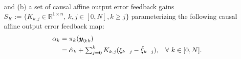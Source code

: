 \documentclass[letterpaper, 10 pt, conference]{ieeeconf}
\newcommand{\R}{\mathbb{R}}
\newcommand{\?}{\stackrel{?}{=}}
\newcommand{\param}{\theta}
\newcommand{\var}{\xi}
\newcommand{\varDim}{n}
\newcommand{\outputStacked}{\boldsymbol{y}}
\newcommand{\varNominal}{\hat\var}
\newcommand{\paramNominal}{\hat\param}
\newcommand{\ratePGDNominal}{\hat\ratePGD}
\newcommand{\ratePGD}{\alpha}
\newcommand{\feedbackMap}{\pi}
\newcommand{\feedbackGain}{K}
\newcommand{\setFeedbackGains}{S_\feedbackGain}
\newcommand{\iterationHorizon}{N}
\newcommand{\frank}[1]{{\textcolor[rgb]{0,0,1}{\textsf{[Frank: {#1}]}}}}
\newcommand{\glen}[1]{{\textcolor[rgb]{1,0,0}{\textsf{[Glen: {#1}]}}}}
\newcommand{\antoine}[1]{{\textcolor[rgb]{1,0,0}{\textsf{[Antoine: {#1}]}}}}
\begin{document}
and (b) a set of causal affine output error feedback gains $\setFeedbackGains := \{\feedbackGain_{k,j} \in \R^{1 \times \varDim}, \ k,j \in [0,\iterationHorizon], k \geq j \}$
parameterizing the following causal affine output error feedback map:
\begin{align} \nonumber
    \ratePGD_k &= \feedbackMap_k(\outputStacked_{0:k}) \\
    \label{Eqn: Affine Output Feedback Map}
    &= \ratePGDNominal_k + \textstyle\sum_{j=0}^k \feedbackGain_{k,j}(\var_{k-j} - \varNominal_{k-j}),
    \hspace{3mm} \forall \ k \in [0, \iterationHorizon].
\end{align}
\end{document}
